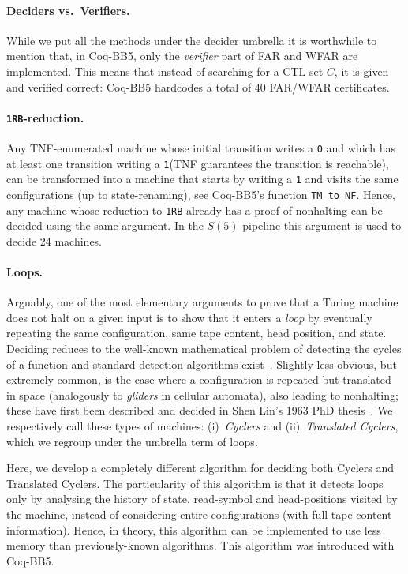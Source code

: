\documentclass[sigconf,screen]{acmart}
\theoremstyle{definition} %
\numberwithin{equation}{section}
\theoremstyle{definition} %
\newcommand{\szero}{\texttt{0}\xspace}
\newcommand{\sone}{\texttt{1}\xspace}
\newcommand{\cyclers}{Cyclers\xspace}
\newcommand{\TCs}{Translated Cyclers\xspace}
\newcommand{\headposs}{head-positions\xspace}
\newcommand{\CoqBB}{Coq-BB5\xspace}
\begin{document}
\paragraph{Deciders vs.~Verifiers.} While we put all the methods under the decider umbrella it is worthwhile to mention that, in \CoqBB, only the \textit{verifier} part of FAR and WFAR are implemented. This means that instead of searching for a CTL set $C$, it is given and verified correct: \CoqBB hardcodes a total of $40$ FAR/WFAR certificates.

\paragraph{\texttt{1RB}-reduction.} Any TNF-enumerated machine whose initial transition writes a \szero and which has at least one transition writing a \sone (TNF guarantees the transition is reachable), can be transformed into a machine that starts by writing a \sone and visits the same configurations (up to state-renaming), see \CoqBB's function \texttt{TM\_to\_NF}. Hence, any machine whose reduction to \texttt{1RB} already has a proof of nonhalting can be decided using the same argument. In the $S(5)$ pipeline this argument is used to decide 24 machines.


\paragraph{Loops.} Arguably, one of the most elementary arguments to prove that a Turing machine does not halt on a given input is to show that it enters a \textit{loop} by eventually repeating the same configuration, \ie same tape content, head position, and state. Deciding  reduces to the well-known mathematical problem of detecting the cycles of a function and standard detection algorithms exist~\cite{wiki:Cycle_detection}. Slightly less obvious, but extremely common, is the case where a configuration is repeated but translated in space (analogously to \textit{gliders} in cellular automata), also leading to nonhalting; these have first been described and decided in Shen Lin's 1963 PhD thesis~\cite{Lin1963}. We respectively call these types of machines: (i)~\textit{\cyclers} and (ii)~\textit{\TCs}, which we regroup under the umbrella term of loops.

Here, we develop a completely different algorithm for deciding both \cyclers and \TCs. The particularity of this algorithm is that it detects loops only by analysing the history of state, read-symbol and \headposs visited by the machine, instead of considering entire configurations (\ie with full tape content information). Hence, in theory, this algorithm can be implemented to use less memory than previously-known algorithms. This algorithm was introduced with \CoqBB.
\end{document}
